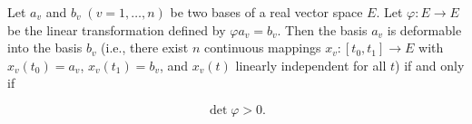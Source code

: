 Let $a_v$ and $b_v\;(v = 1, \ldots, n)$ be two bases of a real vector space $E$. Let $\varphi: E \to E$ be the linear transformation defined by $\varphi a_v = b_v$. Then the basis $a_v$ is deformable into the basis $b_v$ (i.e., there exist $n$ continuous mappings $x_v: [t_0, t_1] \to E$ with $x_v(t_0) = a_v$, $x_v(t_1) = b_v$, and $x_v(t)$ linearly independent for all $t$) if and only if

$$\det \varphi > 0.$$
